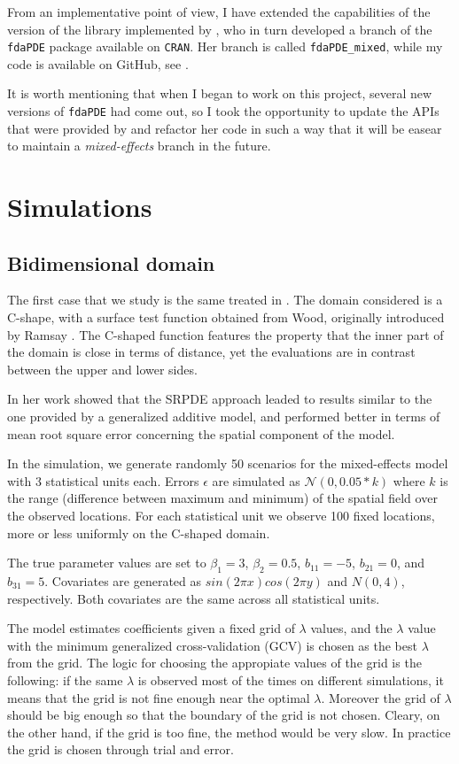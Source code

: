 From an implementative point of view, I have extended the capabilities of the
version of the library implemented by \citeauthor{kim}, who in turn developed a
branch of the \texttt{fdaPDE} package available on \texttt{CRAN}. Her branch is
called \texttt{fdaPDE\_mixed}, while my code is available on GitHub, see
\cite{MI}.

It is worth mentioning that when I began to work on this project, several new
versions of \texttt{fdaPDE} had come out, so I took the opportunity to update
the APIs that were provided by \citeauthor{kim} and refactor her code in such a
way that it will be easear to maintain a \textit{mixed-effects} branch in the
future.

\section{Simulations}
\subsection{Bidimensional domain}
The first case that we study is the same treated in \cite{kim}. The domain
considered is a C-shape, with a surface test function obtained from
Wood\cite{wood2008soap}, originally introduced by Ramsay
\cite{ramsay2002spline}. The C-shaped function features the property that the
inner part of the domain is close in terms of distance, yet the evaluations are
in contrast between the upper and lower sides.

In her work \citeauthor{kim} showed that the SRPDE approach leaded to results
similar to the one provided by a generalized additive model, and performed
better in terms of mean root square error concerning the spatial component of
the model.

In the simulation, we generate randomly 50 scenarios for the mixed-effects
model with 3 statistical units each. Errors $\epsilon$ are simulated as
$\mathcal{N}(0, 0.05*k)$ where $k$ is the range (difference between maximum and
minimum) of the spatial field over the observed locations. For each statistical
unit we observe 100 fixed locations, more or less uniformly on the C-shaped
domain.

The true parameter values are set to $\beta_1 = 3$, $\beta_2 = 0.5$, $b_{11} =
	-5$, $b_{21} = 0$, and $b_{31} = 5$. Covariates are generated as $sin(2\pi
	x)cos(2\pi y)$ and $N(0, 4)$, respectively. Both covariates are the same across
all statistical units.

The model estimates coefficients given a fixed grid of $\lambda$ values, and
the $\lambda$ value with the minimum generalized cross-validation (GCV) is
chosen as the best $\lambda$ from the grid. The logic for choosing the
appropiate values of the grid is the following: if the same $\lambda$ is
observed most of the times on different simulations, it means that the grid is
not fine enough near the optimal $\lambda$. Moreover the grid of $\lambda$
should be big enough so that the boundary of the grid is not chosen. Cleary, on
the other hand, if the grid is too fine, the method would be very slow. In
practice the grid is chosen through trial and error.

